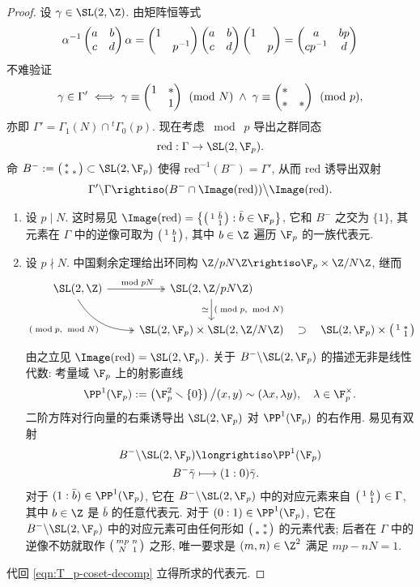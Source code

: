 \begin{proof}
	设 $\gamma \in \SL(2, \Z)$. 由矩阵恒等式
	\[ \alpha^{-1} \begin{pmatrix} a & b \\ c & d \end{pmatrix} \alpha = \begin{pmatrix} 1 &  \\  & p^{-1} \end{pmatrix} \begin{pmatrix} a & b \\ c & d \end{pmatrix} \begin{pmatrix} 1 &  \\  & p \end{pmatrix} = \begin{pmatrix} a & bp \\ cp^{-1} & d \end{pmatrix} \]
	不难验证
	\begin{equation}\label{eqn:Gamma1Np}
		\gamma \in \Gamma' \iff \gamma \equiv \begin{pmatrix} 1 & * \\  & 1 \end{pmatrix} \pmod{N} \; \wedge \; \gamma \equiv \begin{pmatrix} * &  \\ * & * \end{pmatrix} \pmod{p},
	\end{equation}
	亦即 $\Gamma' = \Gamma_1(N) \cap {}^t \Gamma_0(p)$. 现在考虑 $\bmod \;p$ 导出之群同态
	\[ \text{red}: \Gamma \to \SL(2, \F_p). \]
	命 $B^- := \twomatrix{*}{}{*}{*} \subset \SL(2, \F_p)$ 使得 $\text{red}^{-1}(B^-) = \Gamma'$, 从而 $\text{red}$ 诱导出双射
	\begin{equation}\label{eqn:T_p-coset-decomp}
		\Gamma' \backslash \Gamma \rightiso (B^- \cap \Image(\text{red})) \big\backslash \Image(\text{red}).
	\end{equation}
	\begin{enumerate}
		\item 设 $p \mid N$. 这时易见 $\Image(\text{red}) = \left\{ \twomatrix{1}{\bar{b}}{}{1} : \bar{b} \in \F_p \right\}$, 它和 $B^-$ 之交为 $\{1\}$, 其元素在 $\Gamma$ 中的逆像可取为 $\bigl(\begin{smallmatrix} 1 & b \\  & 1 \end{smallmatrix}\bigr)$, 其中 $b \in \Z$ 遍历 $\F_p$ 的一族代表元.
		\item 设 $p \nmid N$. 中国剩余定理给出环同构 $\Z/pN\Z \rightiso \F_p \times \Z/N\Z$, 继而
		\[\begin{tikzcd}
			\SL(2,\Z) \arrow[twoheadrightarrow, r, "{\bmod pN}"] \arrow[twoheadrightarrow, start anchor=south, end anchor=west, bend right, rd, "{(\bmod p,\; \bmod N)}"'] & \SL(2, \Z/pN\Z) \arrow[d, "{(\bmod p,\; \bmod N)}", "\simeq"'] & \\
			& \SL(2, \F_p) \times \SL(2, \Z/N\Z) & \SL(2, \F_p) \times \twomatrix{1}{*}{}{1} \arrow[phantom, l, "\supset" sloped]
		\end{tikzcd}\]
		由之立见 $\Image(\text{red}) = \SL(2,\F_p)$. 关于 $B^- \backslash \SL(2,\F_p)$ 的描述无非是线性代数: 考量域 $\F_p$ 上的射影直线
		\[ \PP^1(\F_p) := \left( \F_p^2 \smallsetminus \{0\}\right) \big/ (x,y) \sim (\lambda x, \lambda y), \quad \lambda \in \F_p^\times. \]
		二阶方阵对行向量的右乘诱导出 $\SL(2, \F_p)$ 对 $\PP^1(\F_p)$ 的右作用. 易见有双射
		\begin{align*}
			B^- \backslash \SL(2, \F_p) & \longrightiso \PP^1(\F_p) \\
			B^- \bar{\gamma} & \longmapsto (1:0)\bar{\gamma}.
		\end{align*}
		对于 $(1:\bar{b}) \in \PP^1(\F_p)$, 它在 $B^- \backslash \SL(2,\F_p)$ 中的对应元素来自 $\bigl(\begin{smallmatrix} 1 & b \\  & 1 \end{smallmatrix}\bigr) \in \Gamma$, 其中 $b \in \Z$ 是 $\bar{b}$ 的任意代表元. 对于 $(0:1) \in \PP^1(\F_p)$, 它在 $B^- \backslash \SL(2, \F_p)$ 中的对应元素可由任何形如 $\bigl(\begin{smallmatrix}  & * \\ * & * \end{smallmatrix}\bigr)$ 的元素代表; 后者在 $\Gamma$ 中的逆像不妨就取作 $\bigl(\begin{smallmatrix} mp & n \\ N & 1 \end{smallmatrix}\bigr)$ 之形, 唯一要求是 $(m,n) \in \Z^2$ 满足 $mp - nN = 1$.
	\end{enumerate}
	代回 \eqref{eqn:T_p-coset-decomp} 立得所求的代表元.
\end{proof}

